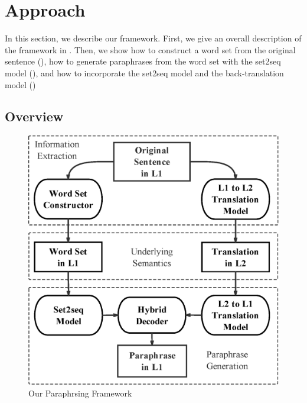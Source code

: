 \section{Approach}
In this section, we describe our framework. First, we give an overall description of the framework in . Then, we show how to construct a word set from the original sentence (), how to generate paraphrases from the word set with the set2seq model (), and how to incorporate the set2seq model and the back-translation model ()

\subsection{Overview} \label{sec:overview}
\begin{figure}[h]
\centering
\includegraphics[width=0.9\columnwidth]{pic.eps}
\caption{Our Paraphrsing Framework}
\label{fig:app}
\end{figure}


